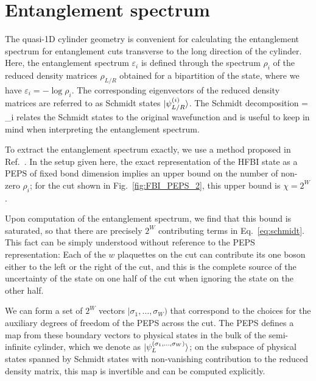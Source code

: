 
\newcommand{\uL}{\mathbf{L_0}}
\newcommand{\bL}{\mathbf{\bar{L}_0}}

\section{Entanglement spectrum}
\label{sec:ES}

The quasi-1D cylinder geometry is convenient for calculating the
entanglement spectrum for entanglement cuts transverse to the long direction of the
cylinder. Here, the entanglement spectrum $\varepsilon_i$ is defined through the spectrum
$\rho_i$ of the reduced density matrices $\rho_{L/R}$ obtained for a bipartition of the state,
where we have $\varepsilon_i = -\log \rho_i$.
The corresponding eigenvectors of the reduced density matrices
are referred to as Schmidt states $\vert \psi^{(i)}_{L/R} \rangle$. 
The Schmidt decomposition 
\beq
\ket{\psi} = \sum\limits_i 
\label{eq:schmidt}
\eeq
relates the Schmidt states to the original wavefunction and is useful to keep in mind
when interpreting the entanglement spectrum.

To extract the entanglement spectrum exactly,
we use a method proposed in Ref.~.
In the setup given here, the exact representation of the HFBI state as a PEPS of
fixed bond dimension implies an upper bound on the number of non-zero $\rho_i$; 
for the cut shown in Fig.~\ref{fig:FBI_PEPS_2}, this upper bound is $\chi=2^W$.

Upon computation of the entanglement spectrum, we find that this bound is saturated,
so that there are precisely $2^W$ contributing terms in Eq.~\ref{eq:schmidt}.
This fact can be simply understood without reference to the PEPS representation:
Each of the $w$ plaquettes on the cut can contribute its one boson either to the left
or the right of the cut, and this is the complete source of the uncertainty
of the state on one half of the cut when ignoring the state on the other half.

We can form a set of $2^W$ vectors $|\sigma_1,\ldots,\sigma_W)$ that correspond to the
choices for the auxiliary degrees of freedom of the PEPS across the cut. The PEPS defines
a map from these boundary vectors to physical states in the bulk of the
semi-infinite cylinder, which we denote as $\vert \psi_L^{(\sigma_1, \ldots, \sigma_W)} \rangle$;
on the subspace of physical states spanned by Schmidt states with non-vanishing contribution
to the reduced density matrix, this map is invertible and can be computed explicitly.

